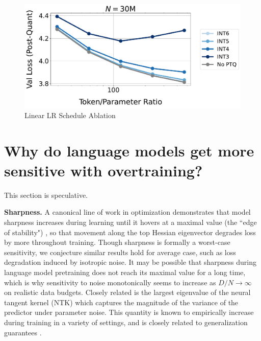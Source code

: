 \documentclass[11pt]{article}
\begin{document}
\begin{figure}
    \centering
    \includegraphics[width=0.5\linewidth]{tpr_gptq_linear_schedule.pdf}
    \caption{{Linear LR Schedule Ablation}}
    \label{fig:lr-schedule}
\end{figure}



\section{Why do language models get more sensitive with overtraining?}
\label{appdx:sharpness}

This section is speculative. 


\textbf{Sharpness.} A canonical line of work in optimization demonstrates that model sharpness increases during learning until it hovers at a maximal value (the ``edge of stability") \citep{cohen2021gradient, gilmer2021loss}, so that movement along the top Hessian eigenvector degrades loss by more throughout training. Though sharpness is formally a worst-case sensitivity, we conjecture similar results hold for average case, such as loss degradation induced by isotropic noise. It may be possible that sharpness during language model pretraining does not reach its maximal value for a long time, which is why sensitivity to noise monotonically seems to increase as $D/N \to \infty$ on realistic data budgets. Closely related is the largest eigenvalue of the neural tangent kernel (NTK) which captures the magnitude of the variance of the predictor under parameter noise. This quantity is known to empirically increase during training in a variety of settings, and is closely related to generalization guarantees \citep{nguyen2021tight, atanasov2022onset}. 
\end{document}
